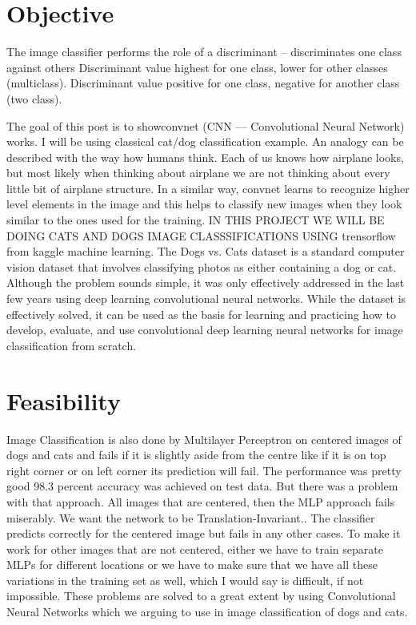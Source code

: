 \documentclass{article}
\begin{document}
\section{Objective}
The image classifier performs the role of a discriminant
– discriminates one class against others
Discriminant value highest for one class, lower for other
classes (multiclass).
Discriminant value positive for one class, negative for
another class (two class).


The goal of this post is to showconvnet (CNN — Convolutional Neural Network) works. I will be using classical cat/dog classification example.  An analogy can be described with the way how humans think. Each of us knows how airplane looks, but most likely when thinking about airplane we are not thinking about every little bit of airplane structure. In a similar way, convnet learns to recognize higher level elements in the image and this helps to classify new images when they look similar to the ones used for the training. IN THIS PROJECT WE WILL BE DOING CATS AND DOGS IMAGE CLASSSIFICATIONS USING trensorflow from kaggle machine learning. The Dogs vs. Cats dataset is a standard computer vision dataset that involves classifying photos as either containing a dog or cat. Although the problem sounds simple, it was only effectively addressed in the last few years using deep learning convolutional neural networks. While the dataset is effectively solved, it can be used as the basis for learning and practicing how to develop, evaluate, and use convolutional deep learning neural networks for image classification from scratch.\\





\section{Feasibility}

Image Classification is also done by Multilayer Perceptron on centered images of dogs and cats and fails if it is slightly aside from the centre like if it is on top right corner or on left corner its prediction will fail. The performance was pretty good 98.3 percent accuracy was achieved on test data. But there was a problem with that approach. All images that are centered, then the MLP approach fails miserably. We want the network to be Translation-Invariant.. The classifier predicts correctly for the centered image but fails in any other cases. To make it work for other images that are not centered, either we have to train separate MLPs for different locations or we have to make sure that we have all these variations in the training set as well, which I would say is difficult, if not impossible. These problems are solved to a great extent by using Convolutional Neural Networks which we arguing to use in image classification of dogs and cats.\\
\end{document}
